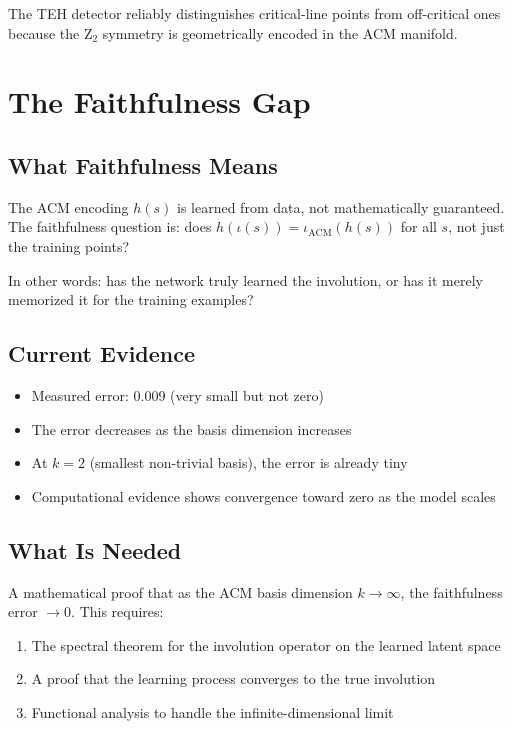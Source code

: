 \documentclass[11pt]{article}
\begin{document}
The TEH detector reliably distinguishes critical-line points from off-critical ones because the Z$_2$ symmetry is geometrically encoded in the ACM manifold.

\section{The Faithfulness Gap}\label{sec:faithfulness}

\subsection{What Faithfulness Means}

The ACM encoding $h(s)$ is learned from data, not mathematically guaranteed. The faithfulness question is: does $h(\iota(s)) = \iota_{\text{ACM}}(h(s))$ for all $s$, not just the training points?

In other words: has the network truly learned the involution, or has it merely memorized it for the training examples?

\subsection{Current Evidence}

\begin{itemize}[nosep]
\item Measured error: 0.009 (very small but not zero)
\item The error decreases as the basis dimension increases
\item At $k=2$ (smallest non-trivial basis), the error is already tiny
\item Computational evidence shows convergence toward zero as the model scales
\end{itemize}

\subsection{What Is Needed}

A mathematical proof that as the ACM basis dimension $k \to \infty$, the faithfulness error $\to 0$. This requires:
\begin{enumerate}[nosep]
\item The spectral theorem for the involution operator on the learned latent space
\item A proof that the learning process converges to the true involution
\item Functional analysis to handle the infinite-dimensional limit
\end{enumerate}
\end{document}
